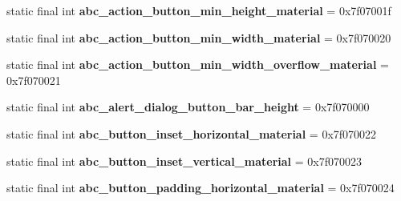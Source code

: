 \begin{DoxyCompactItemize}
\item 
\hypertarget{classandroid_1_1support_1_1design_1_1_r_1_1dimen_a790b0f15fe5f2eacfa6e795235d9eae4}{}static final int {\bfseries abc\+\_\+action\+\_\+button\+\_\+min\+\_\+height\+\_\+material} = 0x7f07001f\label{classandroid_1_1support_1_1design_1_1_r_1_1dimen_a790b0f15fe5f2eacfa6e795235d9eae4}

\item 
\hypertarget{classandroid_1_1support_1_1design_1_1_r_1_1dimen_a37b1e3c9da74daa257a3a466f77f4af9}{}static final int {\bfseries abc\+\_\+action\+\_\+button\+\_\+min\+\_\+width\+\_\+material} = 0x7f070020\label{classandroid_1_1support_1_1design_1_1_r_1_1dimen_a37b1e3c9da74daa257a3a466f77f4af9}

\item 
\hypertarget{classandroid_1_1support_1_1design_1_1_r_1_1dimen_a44e1469815c3f215f8034a6ad69175e4}{}static final int {\bfseries abc\+\_\+action\+\_\+button\+\_\+min\+\_\+width\+\_\+overflow\+\_\+material} = 0x7f070021\label{classandroid_1_1support_1_1design_1_1_r_1_1dimen_a44e1469815c3f215f8034a6ad69175e4}

\item 
\hypertarget{classandroid_1_1support_1_1design_1_1_r_1_1dimen_a0ac12e6518fb27a21c807a9803d7d350}{}static final int {\bfseries abc\+\_\+alert\+\_\+dialog\+\_\+button\+\_\+bar\+\_\+height} = 0x7f070000\label{classandroid_1_1support_1_1design_1_1_r_1_1dimen_a0ac12e6518fb27a21c807a9803d7d350}

\item 
\hypertarget{classandroid_1_1support_1_1design_1_1_r_1_1dimen_aa874e9a2211b7eaf3a6c6b45423ee3d5}{}static final int {\bfseries abc\+\_\+button\+\_\+inset\+\_\+horizontal\+\_\+material} = 0x7f070022\label{classandroid_1_1support_1_1design_1_1_r_1_1dimen_aa874e9a2211b7eaf3a6c6b45423ee3d5}

\item 
\hypertarget{classandroid_1_1support_1_1design_1_1_r_1_1dimen_a4f55256e84d9d47f13cf1553adbbb153}{}static final int {\bfseries abc\+\_\+button\+\_\+inset\+\_\+vertical\+\_\+material} = 0x7f070023\label{classandroid_1_1support_1_1design_1_1_r_1_1dimen_a4f55256e84d9d47f13cf1553adbbb153}

\item 
\hypertarget{classandroid_1_1support_1_1design_1_1_r_1_1dimen_adf85bcb0e234cbc7883e6d6e6dc005e3}{}static final int {\bfseries abc\+\_\+button\+\_\+padding\+\_\+horizontal\+\_\+material} = 0x7f070024\label{classandroid_1_1support_1_1design_1_1_r_1_1dimen_adf85bcb0e234cbc7883e6d6e6dc005e3}


\end{DoxyCompactItemize}
